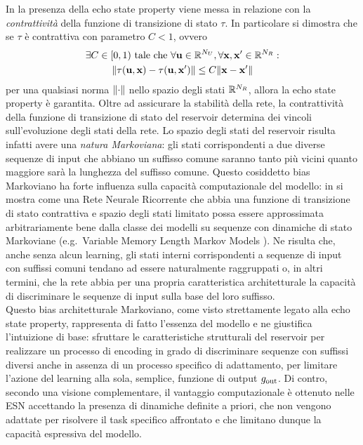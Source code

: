 In \cite{Gallicchio:ArchitecturalAndMarkovian} la presenza della echo state property viene messa in relazione con la \emph{contrattività} della funzione di transizione di stato $\tau$. In particolare si dimostra che se $\tau$ è contrattiva con parametro $C < 1$, ovvero
\begin{multline}
\exists C \in [0,1) \mbox{ tale che } \forall \mathbf{u} \in \mathbb{R}^{N_U}, \forall \mathbf{x}, \mathbf{x}' \in \mathbb{R}^{N_R} : \\
\lVert\tau(\mathbf{u}, \mathbf{x}) - \tau(\mathbf{u}, \mathbf{x}')\rVert \leq C \lVert\mathbf{x} - \mathbf{x}'\rVert
\end{multline}
per una qualsiasi norma $\lVert\cdot\rVert$ nello spazio degli stati $\mathbb{R}^{N_R}$, allora la echo state property è garantita. Oltre ad assicurare la stabilità della rete, la contrattività della funzione di transizione di stato del reservoir determina dei vincoli sull'evoluzione degli stati della rete. Lo spazio degli stati del reservoir risulta infatti avere una \emph{natura Markoviana}: gli stati corrispondenti a due diverse sequenze di input che abbiano un suffisso comune saranno tanto più vicini quanto maggiore sarà la lunghezza del suffisso comune. Questo cosiddetto bias Markoviano ha forte influenza sulla capacità computazionale del modello: in \cite{Hammer:RNNWithSmallWeights, Tino:MarkovianArchitecturalBias} si mostra come una Rete Neurale Ricorrente che abbia una funzione di transizione di stato contrattiva e spazio degli stati limitato possa essere approssimata arbitrariamente bene dalla classe dei modelli su sequenze con dinamiche di stato Markoviane (e.g.\ Variable Memory Length Markov Models \cite{Ron:ThePowerOfAmnesia}). Ne risulta che, anche senza alcun learning, gli stati interni corrispondenti a sequenze di input con suffissi comuni tendano ad essere naturalmente raggruppati o, in altri termini, che la rete abbia per una propria caratteristica architetturale la capacità di discriminare le sequenze di input sulla base del loro suffisso.\\
Questo bias architetturale Markoviano, come visto strettamente legato alla echo state property, rappresenta di fatto l'essenza del modello e ne giustifica l'intuizione di base: sfruttare le caratteristiche strutturali del reservoir per realizzare un processo di encoding in grado di discriminare sequenze con suffissi diversi anche in assenza di un processo specifico di adattamento, per limitare l'azione del learning alla sola, semplice, funzione di output $g_\textup{out}$. 
Di contro, secondo una visione complementare, il vantaggio computazionale è ottenuto nelle ESN accettando la presenza di dinamiche definite a priori, che non vengono adattate per risolvere il task specifico affrontato e che limitano dunque la capacità espressiva del modello.

